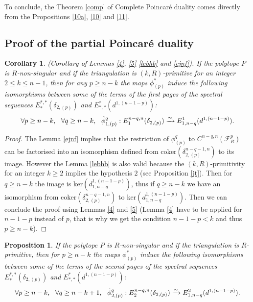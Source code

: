 \documentclass{article}
\newtheorem{corollary}{Corollary}
\newtheorem{proposition}{Proposition}
\begin{document}
To conclude, the Theorem \ref{comp} of Complete Poincaré duality comes directly from the Propositions \ref{10a}, \ref{10} and \ref{11}.
\subsection{Proof of the partial Poincaré duality}
\begin{corollary}
    (Corollary of Lemmas \ref{4}, \ref{5} \ref{lebhb} and \ref{ejnf}). If the polytope $P$ is $R$-non-singular and if the triangulation is $(k,R)$-primitive for an integer $2\leq k \leq n-1$, then for any $p \geq n-k$ the maps $\phi^*_{(p)}$ induce the following isomorphisms between some of the terms of the first pages of the spectral sequences $E_*^{*,*}(\delta_{2,(p)})$ and $E^*_{*,*}(d^{1,(n-1-p)})$:
    \begin{equation*}
       \forall p \geq n-k,~~\forall q\geq n-k,~~ \Tilde{\phi}^q_{1,(p)}: E_1^{n-q,n}(\delta_{2,(p)}) \xrightarrow{\sim} E^1_{1,n-q}(d^{1,(n-1-p)}).
    \end{equation*}
\end{corollary}

\begin{proof}
    The Lemma \ref{ejnf} implies that the restriction of $\phi^q_{(p)}$ to $C^{n-q,n}(\mathcal{F}^p_R)$ can be factorised into an isomorphism defined from $\mathrm{coker}(\delta_{2,(p)}^{n-q-1,n})$ to its image. However the Lemma \ref{lebhb} is also valid because the $(k,R)$-primitivity for an integer $k\geq 2$ implies the hypothesis $2$ (see Proposition \ref{jt}). Then for $q\geq n-k$ the image is $\mathrm{ker}(d^{1,(n-1-p)}_{1,n-q})$, thus if $q\geq n-k$ we have an isomorphism from $\mathrm{coker}(\delta_{2,(p)}^{n-q-1,n})$ to $\mathrm{ker}(d^{1,(n-1-p)}_{1,n-q})$. Then we can conclude the proof using Lemmas \ref{4} and \ref{5} (Lemma \ref{4} have to be applied for $n-1-p$ instead of $p$, that is why we get the condition $n-1-p < k$ and thus $p\geq n-k$).
\end{proof}

\begin{proposition}
    If the polytope $P$ is $R$-non-singular and if the triangulation is $R$-primitive, then for $p \geq n-k$ the maps $\phi^*_{(p)}$ induce the following isomorphisms between some of the terms of the second pages of the spectral sequences $E_*^{*,*}(\delta_{2,(p)})$ and $E^*_{*,*}(d^{1,(n-1-p)})$:
    \begin{equation*}
        \forall p \geq n-k,~~\forall q\geq n-k+1,~~\Tilde{\phi}^q_{2,(p)}: E_2^{n-q,n}(\delta_{2,(p)}) \xrightarrow{\sim} E^2_{1,n-q}(d^{1,(n-1-p)}).
    \end{equation*}
    \label{11p}
\end{proposition}
\end{document}
